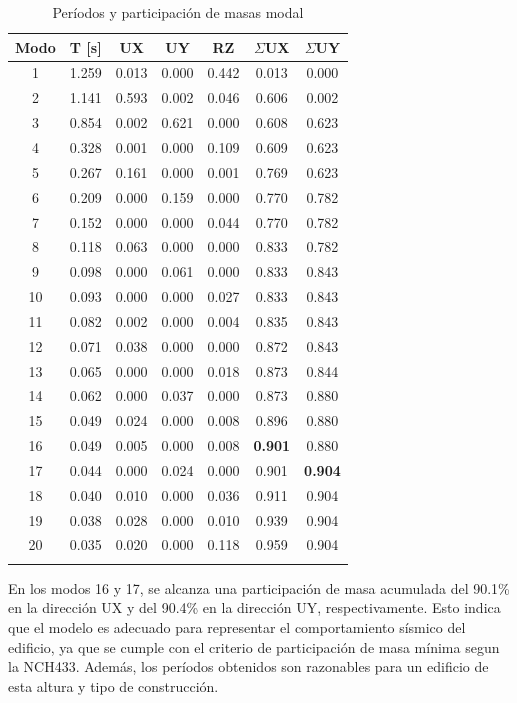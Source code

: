 \begin{table}[H]
    \centering
    \caption{Períodos y participación de masas modal}
    \label{tab:modal}
    \begin{tabular}{ccccccc}
    \hline
    \textbf{Modo} & \textbf{T [s]} & \textbf{UX} & \textbf{UY} & \textbf{RZ} & \textbf{$\Sigma$UX} & \textbf{$\Sigma$UY} \\
    \hline
    1  & 1.259 & 0.013  & 0.000  & 0.442 & 0.013 & 0.000 \\
    2  & 1.141 & 0.593  & 0.002  & 0.046 & 0.606 & 0.002 \\
    3  & 0.854 & 0.002  & 0.621  & 0.000 & 0.608 & 0.623 \\
    4  & 0.328 & 0.001  & 0.000  & 0.109 & 0.609 & 0.623 \\
    5  & 0.267 & 0.161  & 0.000  & 0.001 & 0.769 & 0.623 \\
    6  & 0.209 & 0.000  & 0.159  & 0.000 & 0.770 & 0.782 \\
    7  & 0.152 & 0.000  & 0.000  & 0.044 & 0.770 & 0.782 \\
    8  & 0.118 & 0.063  & 0.000  & 0.000 & 0.833 & 0.782 \\
    9  & 0.098 & 0.000  & 0.061  & 0.000 & 0.833 & 0.843 \\
    10 & 0.093 & 0.000  & 0.000  & 0.027 & 0.833 & 0.843 \\
    11 & 0.082 & 0.002  & 0.000  & 0.004 & 0.835 & 0.843 \\
    12 & 0.071 & 0.038  & 0.000  & 0.000 & 0.872 & 0.843 \\
    13 & 0.065 & 0.000  & 0.000  & 0.018 & 0.873 & 0.844 \\
    14 & 0.062 & 0.000  & 0.037  & 0.000 & 0.873 & 0.880 \\
    15 & 0.049 & 0.024  & 0.000  & 0.008 & 0.896 & 0.880 \\
    \hline
    16 & 0.049 & 0.005  & 0.000  & 0.008 & \textbf{0.901} & 0.880 \\
    \hline
    17 & 0.044 & 0.000  & 0.024  & 0.000 & 0.901 & \textbf{0.904} \\
    \hline
    18 & 0.040 & 0.010  & 0.000  & 0.036 & 0.911 & 0.904 \\
    19 & 0.038 & 0.028  & 0.000  & 0.010 & 0.939 & 0.904 \\
    20 & 0.035 & 0.020  & 0.000  & 0.118 & 0.959 & 0.904 \\
    \hline
    \vspace{0.001cm}
    \end{tabular}
    
\end{table}

En los modos 16 y 17, se alcanza una participación de masa acumulada del 90.1\% en la dirección UX y del 90.4\% en la dirección UY, respectivamente. Esto indica que el modelo es adecuado para representar el comportamiento sísmico del edificio, ya que se cumple con el criterio de participación de masa mínima segun la NCH433. Además, los períodos obtenidos son razonables para un edificio de esta altura y tipo de construcción.